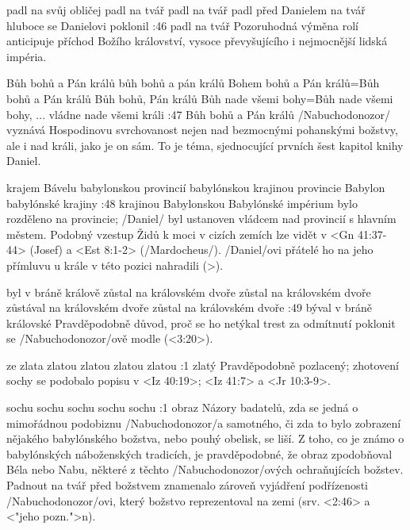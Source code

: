     {padl na svůj obličej} %
    {padl na tvář}  %
    {padl na tvář} %
    {padl před Danielem na tvář}  %
    {hluboce se Danielovi poklonil}  %
:46 {padl na tvář} Pozoruhodná výměna rolí anticipuje příchod Božího království, vysoce převyšujícího i nejmocnější lidská impéria.

    {Bůh bohů a Pán králů} %
    {bůh bohů a pán králů}  %
    {Bohem bohů a Pán králů}={Bůh bohů a Pán králů} %
    {Bůh bohů, Pán králů}  %
    {Bůh nade všemi bohy}={Bůh nade všemi bohy, ... vládne nade všemi králi}  %
:47 {Bůh bohů a Pán králů} \x/Nabuchodonozor/ vyznává Hospodinovu svrchovanost nejen nad bezmocnými pohanskými božstvy, ale i nad králi, jako je on sám. To je téma, sjednocující prvních šest kapitol knihy Daniel.

    {krajem Bávelu} %
    {babylonskou provincií}  %
    {babylónskou krajinou} %
    {provincie Babylon}  %
    {babylónské krajiny}  %
:48 {krajinou Babylonskou} Babylónské impérium bylo rozděleno na provincie;  \x/Daniel/ byl ustanoven vládcem nad provincií s hlavním městem. Podobný vzestup Židů k moci v cizích zemích lze vidět v <Gn 41:37-44> (Josef) a <Est 8:1-2> (\x/Mardocheus/). \x/Daniel/ovi přátelé ho na jeho přímluvu u krále v této pozici nahradili (>).

    {byl v bráně králově} %
    {zůstal na královském dvoře}  %
    {zůstal na královském dvoře} %
    {zůstával na královském dvoře}  %
    {zůstal na královském dvoře}  %
:49 {býval v bráně královské} Pravděpodobně důvod, proč se ho netýkal trest za odmítnutí poklonit se \x/Nabuchodonozor/ově modle (<3:20>).

    {ze zlata} %
    {zlatou}  %
    {zlatou} %
    {zlatou}  %
    {zlatou}  %
:1 {zlatý}  Pravděpodobně pozlacený; zhotovení sochy se podobalo popisu v <Iz 40:19>; <Iz 41:7> a  <Jr 10:3-9>.

    {sochu} %
    {sochu}  %
    {sochu} %
    {sochu}  %
    {sochu}  %
:1 {obraz} Názory badatelů, zda se jedná o mimořádnou podobiznu  \x/Nabuchodonozor/a samotného, či zda to bylo zobrazení nějakého babylónského božstva, nebo pouhý obelisk, se liší. Z toho, co je známo o babylónských náboženských tradicích, je pravděpodobné, že obraz zpodobňoval Béla nebo Nabu, některé z těchto \x/Nabuchodonozor/ových ochraňujících božstev. Padnout na tvář před božstvem znamenalo zároveň vyjádření podřízenosti \x/Nabuchodonozor/ovi, který božstvo reprezentoval na zemi (srv. <2:46> a <"jeho pozn.">n). 

